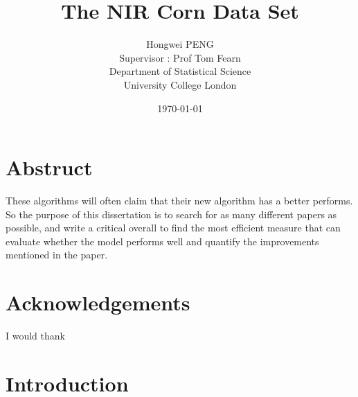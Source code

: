 \documentclass[a4paper,12pt,titlepage]{article} %
\title{The NIR Corn Data Set}
\author{Hongwei PENG \vspace{2cm} \\
	Supervisor : Prof Tom Fearn \vspace{2cm} \\
	Department of Statistical Science \\
	University College London}
\date{\today} %
\numberwithin{equation}{section}  %
\begin{document}
	\maketitle         %
	
	\section{Abstruct} 
	These algorithms will often claim that their new algorithm has a better performs. So the purpose of this dissertation is to search for as many different papers as possible, and write a critical overall to find the most efficient measure that can evaluate whether the model performs well and quantify the improvements mentioned in the paper.
	\newpage           %
	
	\section{Acknowledgements} 
 	I would thank
	\newpage           %
	
	\tableofcontents   %
	\newpage           %
	

	
	\section{Introduction}             %
	\label{sec:intro}                  %
	
\end{document}
